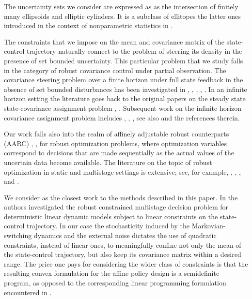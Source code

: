 \documentclass[letterpaper,11pt]{article}
\begin{document}
The uncertainty sets we consider are expressed as as the intersection of
finitely many ellipsoids and elliptic cylinders. It is a subclass of 
ellitopes the latter ones introduced in the context of nonparametric statistics in \cite{jud_17}. 


The constraints that we impose on the mean and covariance matrix of the state-control trajectory naturally connect to the problem of steering  
its density  in the presence of set bounded uncertainty. 
This particular problem that we study falls in the category of robust covariance control under partial observation. 
The covariance steering problem over a finite horizon under full state feedback in the absence of set bounded disturbances has been investigated in \cite{chen_1}, \cite{chen_2}, \cite{chen_3},
\cite{okamoto}, \cite{bakolas}.  In an infinite horizon setting  the literature goes back to the original papers on the steady state state-covariance 
assignment problem \cite{hotz1}, \cite{hotz2}. Subsequent work on the infinite horizon covariance assignment problem includes \cite{xu}, \cite{yasuda}, \cite{grigoriadis},
see also \cite{skelton} and the references therein. 

Our work falls also into the realm of affinely adjustable robust counterparts (AARC) \cite{bental3}, \cite{bental1},
for robust optimization problems, where optimization variables correspond to decisions that are made sequentially
as the actual values of the uncertain data become  available. The literature on the topic of robust optimization in static and  multistage settings is extensive; see, for example, \cite{bental4}, \cite{bental5}, \cite{bertsimas1}, \cite{sim1} and \cite{brown1}.

We consider  \cite{bental2}  as the closest work to the methods described in this paper. 
In \cite{bental2} the authors investigated
the robust constrained multistage decision problem for  deterministic linear dynamic models 
subject to linear constraints on the state-control trajectory. 
In our case the stochasticity induced by the Markovian-switching dynamics and the external noise dictates the use of quadratic constraints, instead of linear ones, to meaningfully confine not only the mean of the state-control trajectory,
but also keep its covariance matrix within a desired range. The price one pays for considering the wider class of constraints is that the resulting convex formulation for the affine policy design is a semidefinite program, as opposed to the corresponding linear programming formulation encountered in \cite{bental2}. 
\end{document}
